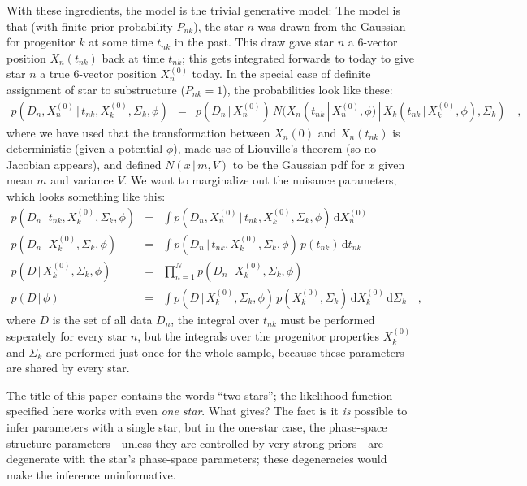 \documentclass[letterpaper,12pt,preprint]{aastex}
\newcommand{\given}{\,|\,}
\newcommand{\dd}{\mathrm{d}}
\begin{document}
With these ingredients, the model is the trivial generative model: The
model is that (with finite prior probability $P_{nk}$), the star $n$
was drawn from the Gaussian for progenitor $k$ at some time $t_{nk}$
in the past.  This draw gave star $n$ a 6-vector position
$X_n(t_{nk})$ back at time $t_{nk}$; this gets integrated forwards to
today to give star $n$ a true 6-vector position $X_n^{(0)}$ today.  In the special case
of definite assignment of star to substructure ($P_{nk}=1$), the
probabilities look like these:
\begin{eqnarray}
p(D_n, X_n^{(0)}\given t_{nk}, X_k^{(0)}, \Sigma_k, \phi) &=&
  p(D_n\given X_n^{(0)})\,N(X_n(t_{nk}\given X_n^{(0)}, \phi)\given X_k(t_{nk}\given X_k^{(0)}, \phi), \Sigma_k)
\quad ,
\end{eqnarray}
where we have used that the transformation between $X_n(0)$ and
$X_n(t_{nk})$ is deterministic (given a potential $\phi$), made use of
Liouville's theorem (so no Jacobian appears), and defined $N(x\given
m, V)$ to be the Gaussian pdf for $x$ given mean $m$ and variance $V$.
We want to marginalize out the nuisance parameters, which looks
something like this:
\begin{eqnarray}
p(D_n\given t_{nk}, X_k^{(0)}, \Sigma_k, \phi) &=&
  \int p(D_n, X_n^{(0)}\given t_{nk}, X_k^{(0)}, \Sigma_k, \phi)\,\dd X_n^{(0)}
\\
p(D_n\given X_k^{(0)}, \Sigma_k, \phi) &=&
  \int p(D_n\given t_{nk}, X_k^{(0)}, \Sigma_k, \phi)
  \,p(t_{nk})\,\dd t_{nk}
\\
p(D\given X_k^{(0)}, \Sigma_k, \phi) &=&
  \prod_{n=1}^N p(D_n\given X_k^{(0)}, \Sigma_k, \phi)
\\
p(D\given \phi) &=&
  \int p(D\given X_k^{(0)}, \Sigma_k, \phi)\,p(X_k^{(0)}, \Sigma_k)\,\dd X_k^{(0)}\,\dd\Sigma_k
\quad ,
\end{eqnarray}
where $D$ is the set of all data $D_n$, the integral over $t_{nk}$
must be performed seperately for every star $n$, but the integrals
over the progenitor properties $X_k^{(0)}$ and $\Sigma_k$ are
performed just once for the whole sample, because these parameters are
shared by every star.

The title of this paper contains the words ``two stars''; the
likelihood function specified here works with even \emph{one star}.
What gives?  The fact is it \emph{is} possible to infer parameters
with a single star, but in the one-star case, the phase-space
structure parameters---unless they are controlled by very strong
priors---are degenerate with the star's phase-space parameters; these
degeneracies would make the inference uninformative.
\end{document}
